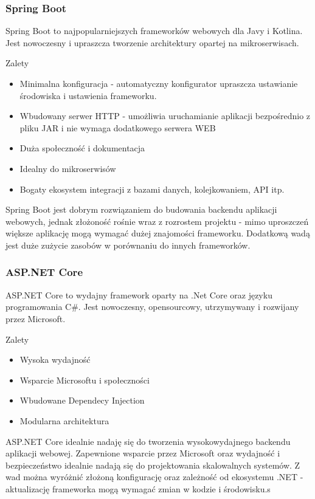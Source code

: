 \subsubsection{Spring Boot}

Spring Boot to najpopularniejszych frameworków webowych dla Javy i Kotlina. Jest nowoczesny i upraszcza tworzenie architektury opartej na mikroserwisach.


Zalety
\begin{itemize}
	\item Minimalna konfiguracja - automatyczny konfigurator upraszcza ustawianie środowiska i ustawienia frameworku.
	\item Wbudowany serwer HTTP - umożliwia uruchamianie aplikacji bezpośrednio z pliku JAR i nie wymaga dodatkowego serwera WEB
	\item Duża społeczność i dokumentacja
	\item Idealny do mikroserwisów
	\item Bogaty ekosystem integracji z bazami danych, kolejkowaniem, API itp.
\end{itemize}

Spring Boot jest dobrym rozwiązaniem do budowania backendu aplikacji webowych, jednak złożoność rośnie wraz z rozrostem projektu - mimo uproszczeń większe aplikację mogą wymagać dużej znajomości frameworku. Dodatkową wadą jest duże zużycie zasobów w porównaniu do innych frameworków.

\subsubsection{ASP.NET Core}

ASP.NET Core to wydajny framework oparty na .Net Core oraz języku programowania C#. Jest nowoczesny, opensourcowy, utrzymywany i rozwijany przez Microsoft.

Zalety
\begin{itemize}
	\item Wysoka wydajność
	\item Wsparcie Microsoftu i społeczności
	\item Wbudowane Dependecy Injection
	\item Modularna architektura
\end{itemize}


ASP.NET Core idealnie nadaję się do tworzenia wysokowydajnego backendu aplikacji webowej. Zapewnione wsparcie przez Microsoft oraz wydajność i bezpieczeństwo idealnie nadają się do projektowania skalowalnych systemów. Z wad można wyróżnić złożoną konfigurację oraz zależność od ekosystemu .NET - aktualizację frameworka mogą wymagać zmian w kodzie i środowisku.s

